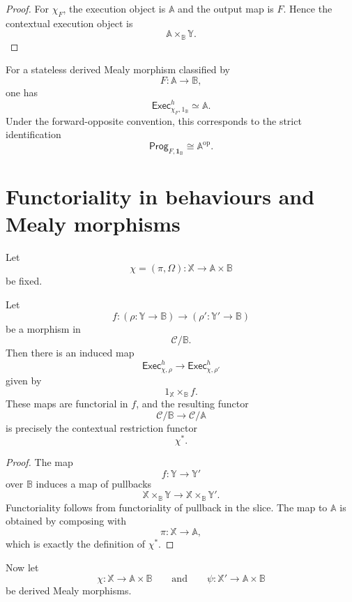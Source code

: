 \begin{proof}
For \(\chi_F\), the execution object is \(\mathbb A\) and the output map is
\(F\). Hence the contextual execution object is
\[
\mathbb A\times_{\mathbb B}\mathbb Y.
\]
\end{proof}

\begin{corollary}
\label{cor:derived-terminal-stateless-case}
For a stateless derived Mealy morphism classified by
\[
F:\mathbb A\to\mathbb B,
\]
one has
\[
\mathsf{Exec}^h_{\chi_F,1_{\mathbb B}}
\simeq
\mathbb A.
\]
Under the forward-opposite convention, this corresponds to the strict
identification
\[
\mathsf{Prog}_{F,\mathbf 1_{\mathbb B}}
\cong
\mathbb A^{\mathrm{op}}.
\]
\end{corollary}

\section{Functoriality in behaviours and Mealy morphisms}
\label{sec:derived-relative-functoriality}

Let
\[
\chi=(\pi,\Omega):\mathbb X\to\mathbb A\times\mathbb B
\]
be fixed.

\begin{proposition}
\label{prop:derived-functoriality-downstream}
Let
\[
f:
(\rho:\mathbb Y\to\mathbb B)
\longrightarrow
(\rho':\mathbb Y'\to\mathbb B)
\]
be a morphism in
\[
\mathcal C/\mathbb B.
\]
Then there is an induced map
\[
\mathsf{Exec}^h_{\chi,\rho}
\longrightarrow
\mathsf{Exec}^h_{\chi,\rho'}
\]
given by
\[
1_{\mathbb X}\times_{\mathbb B}f.
\]
These maps are functorial in \(f\), and the resulting functor
\[
\mathcal C/\mathbb B\to\mathcal C/\mathbb A
\]
is precisely the contextual restriction functor
\[
\chi^\ast.
\]
\end{proposition}

\begin{proof}
The map
\[
f:\mathbb Y\to\mathbb Y'
\]
over \(\mathbb B\) induces a map of pullbacks
\[
\mathbb X\times_{\mathbb B}\mathbb Y
\to
\mathbb X\times_{\mathbb B}\mathbb Y'.
\]
Functoriality follows from functoriality of pullback in the slice. The map to
\(\mathbb A\) is obtained by composing with
\[
\pi:\mathbb X\to\mathbb A,
\]
which is exactly the definition of \(\chi^\ast\).
\end{proof}

Now let
\[
\chi:\mathbb X\to\mathbb A\times\mathbb B
\qquad
\text{and}
\qquad
\psi:\mathbb X'\to\mathbb A\times\mathbb B
\]
be derived Mealy morphisms.

